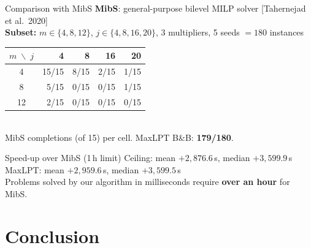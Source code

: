 \documentclass[fleqn,11pt,aspectratio=43]{beamer}
\begin{document}
\begin{frame}[shrink=5]{Comparison with MibS}
  \textbf{MibS}: general-purpose bilevel MILP solver [Tahernejad et al.\ 2020]\\
  \textbf{Subset:} $m\in\{4,8,12\}$, $j\in\{4,8,16,20\}$, 3 multipliers, 5 seeds $=180$ instances

  \begin{center}\small
  \begin{tabular}{crrrr}
    \toprule
    $m\;\backslash\; j$ & 4 & 8 & 16 & 20\\
    \midrule
    4  & 15/15 & 8/15 & 2/15 & 1/15\\
    8  & 5/15  & 0/15 & 0/15 & 1/15\\
    12 & 2/15  & 0/15 & 0/15 & 0/15\\
    \bottomrule
  \end{tabular}\\[0.2em]
  {\footnotesize MibS completions (of 15) per cell. MaxLPT B\&B: \textbf{179/180}.}
  \end{center}

  \begin{alertblock}{Speed-up over MibS (1\,h limit)}
    \small Ceiling: mean $+2{,}876.6$\,s, median $+3{,}599.9$\,s\quad
    MaxLPT: mean $+2{,}959.6$\,s, median $+3{,}599.5$\,s\\
    Problems solved by our algorithm in milliseconds require \textbf{over an hour} for MibS.
  \end{alertblock}
\end{frame}

\section{Conclusion}
\end{document}
